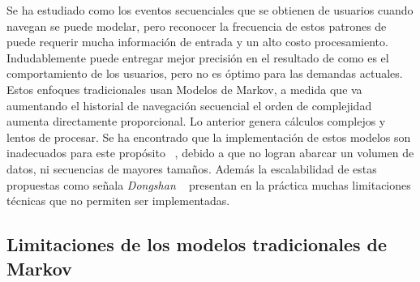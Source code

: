 
 


Se ha estudiado como los eventos secuenciales que se obtienen de usuarios \web cuando navegan se puede modelar, pero reconocer la frecuencia de estos patrones de \webasccess puede requerir mucha  información de entrada y un alto costo procesamiento.  Indudablemente puede entregar mejor precisión en el resultado de como es el comportamiento de los usuarios, pero no es óptimo para las demandas actuales. Estos enfoques tradicionales usan Modelos de Markov, a medida que va aumentando el historial de navegación secuencial el orden de complejidad aumenta directamente proporcional. Lo anterior genera cálculos  complejos y lentos de procesar. Se ha encontrado que la implementación de estos modelos son inadecuados para este propósito~\cite{Dongshan2002} , debido a que no logran abarcar un volumen de datos, ni secuencias de mayores tamaños. Además la escalabilidad de estas propuestas  como señala \emph{Dongshan} \etal~\cite{Dongshan2002} presentan en la práctica muchas limitaciones técnicas que no permiten ser implementadas. 


 








\subsection{Limitaciones de los modelos tradicionales de Markov}





